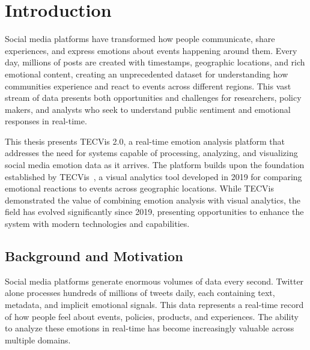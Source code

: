 
\chapter{Introduction}

\label{Chapter1}


\newcommand{\keyword}[1]{\textbf{#1}}
\newcommand{\tabhead}[1]{\textbf{#1}}
\newcommand{\code}[1]{\texttt{#1}}
\newcommand{\file}[1]{\texttt{\bfseries#1}}
\newcommand{\option}[1]{\texttt{\itshape#1}}
\setlength{\parindent}{1.5cm} 


Social media platforms have transformed how people communicate, share experiences, and express emotions about events happening around them. Every day, millions of posts are created with timestamps, geographic locations, and rich emotional content, creating an unprecedented dataset for understanding how communities experience and react to events across different regions. This vast stream of data presents both opportunities and challenges for researchers, policy makers, and analysts who seek to understand public sentiment and emotional responses in real-time.

This thesis presents TECVis 2.0, a real-time emotion analysis platform that addresses the need for systems capable of processing, analyzing, and visualizing social media emotion data as it arrives. The platform builds upon the foundation established by TECVis~\cite{tecvis2023}, a visual analytics tool developed in 2019 for comparing emotional reactions to events across geographic locations. While TECVis demonstrated the value of combining emotion analysis with visual analytics, the field has evolved significantly since 2019, presenting opportunities to enhance the system with modern technologies and capabilities.


\section{Background and Motivation}

Social media platforms generate enormous volumes of data every second. Twitter alone processes hundreds of millions of tweets daily, each containing text, metadata, and implicit emotional signals. This data represents a real-time record of how people feel about events, policies, products, and experiences. The ability to analyze these emotions in real-time has become increasingly valuable across multiple domains.


